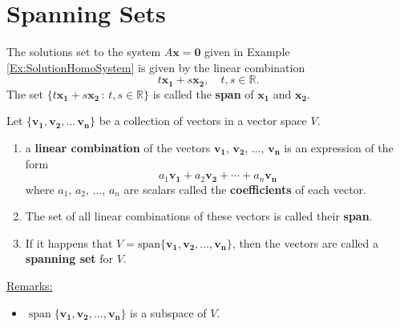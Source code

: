 \documentclass[20pt,a4paper]{extarticle}
\DeclareMathOperator{\Span}{span}
\newcounter{example}
\newcounter{definition}
\begin{document}
\begin{solution}

\end{solution}

\newpage 

\section{Spanning Sets}

\begin{example}
The solutions set to the system $A \mathbf{x} = \mathbf{0}$ given in Example \ref{Ex:SolutionHomoSystem} is given by the linear combination
	\[
		t \mathbf{x_1} + s \mathbf{x_2} , \quad  t, s \in \mathbb{R} .
	\]
The set $\{ t \mathbf{x_1} + s \mathbf{x_2} \, : \, t, s \in \mathbb{R} \}$ is called the \textbf{span} of $\mathbf{x_1}$ and $\mathbf{x_2}$. 
\end{example}

\vspace*{1cm}

\begin{definition}
Let $\{ \mathbf{v_1} , \mathbf{v_2} , \ldots \, \mathbf{v_n} \}$ be a collection of vectors in a vector space $V$.
	\begin{enumerate}[label=\Circled{\arabic*}]
		\item a \textbf{linear combination} of the vectors $\mathbf{v_1}$, $\mathbf{v_2}$, $\ldots$, $\mathbf{v_n}$ is an expression of the form
			\[
				a_1 \mathbf{v_1} + a_2 \mathbf{v_2} + \cdots + a_n \mathbf{v_n} 
			\]
		where $a_1$, $a_2$, $\ldots$, $a_n$ are scalars called the \textbf{coefficients} of each vector.
		\item The set of all linear combinations of these vectors is called their \textbf{span}. %
		\item If it happens that $V = \mathrm{span} \{ \mathbf{v_1} , \mathbf{v_2} , \ldots , \mathbf{v_n} \}$, then the vectors are called a \textbf{spanning set} for $V$. 
	\end{enumerate}
\end{definition}

\underline{Remarks:}
	\begin{itemize}
		\item $\Span \{ \mathbf{v_1} , \mathbf{v_2} , \ldots , \mathbf{v_n} \}$ is a subspace of $V$.
	\end{itemize}
\end{document}
